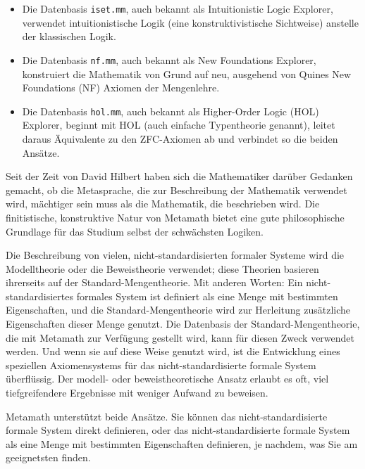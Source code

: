 \begin{itemize}
\item Die Datenbasis
  \texttt{iset.mm},
  auch bekannt als Intuitionistic Logic Explorer,
  verwendet intuitionistische Logik (eine konstruktivistische Sichtweise)
  anstelle der klassischen Logik.
\item Die Datenbasis
  \texttt{nf.mm},
  auch bekannt als New Foundations Explorer,
  konstruiert die Mathematik von Grund auf neu,
  ausgehend von Quines New Foundations (NF) Axiomen der Mengenlehre.
\item Die Datenbasis
  \texttt{hol.mm},
  auch bekannt als Higher-Order Logic (HOL) Explorer,
  beginnt mit HOL (auch einfache Typentheorie genannt), leitet daraus
  Äquivalente zu den ZFC-Axiomen ab und verbindet so die beiden Ansätze.
\end{itemize}

Seit der Zeit von David Hilbert haben sich die Mathematiker darüber Gedanken gemacht, ob die Metasprache, die zur Beschreibung der Mathematik verwendet wird, mächtiger sein muss als die Mathematik, die beschrieben wird.
Die finitistische, konstruktive Natur von Metamath  bietet eine gute philosophische Grundlage für das Studium selbst der schwächsten Logiken.

Die Beschreibung von vielen, nicht-standardisierten formaler Systeme wird die Modelltheorie oder die Beweistheorie verwendet; diese Theorien basieren ihrerseits auf der Standard-Mengentheorie.  Mit anderen Worten: Ein nicht-standardisiertes formales System ist definiert als eine Menge mit bestimmten Eigenschaften, und die Standard-Mengentheorie wird zur Herleitung zusätzliche Eigenschaften dieser Menge genutzt.  Die Datenbasis der Standard-Mengentheorie, die mit Metamath zur Verfügung gestellt wird, kann für diesen Zweck verwendet werden. Und wenn sie auf diese Weise genutzt wird, ist die Entwicklung eines speziellen Axiomensystems für das nicht-standardisierte formale System überflüssig.  Der modell- oder beweistheoretische Ansatz erlaubt es oft, viel tiefgreifendere Ergebnisse mit weniger Aufwand zu beweisen.

Metamath unterstützt beide Ansätze.  Sie können das nicht-standardisierte formale System direkt definieren, oder das nicht-standardisierte formale System als eine Menge mit bestimmten Eigenschaften definieren, je nachdem, was Sie am geeignetsten finden.

